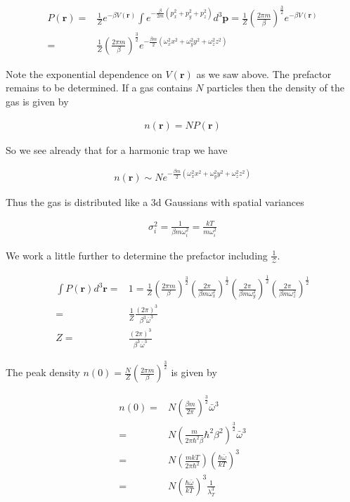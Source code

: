 \documentclass[12pt]{article}
\newcommand{\bv}[1]{\boldsymbol{#1}}
\newcommand{\mc}[1]{\mathcal{#1}}
\begin{document}
\begin{align}
P(\bv{r}) =& \frac{1}{Z} e^{-\beta V(\bv{r})} \int e^{-\frac{\beta}{2m}(p_x^2+p_y^2+p_z^2)} d^3\bv{p} = \frac{1}{Z} \left(\frac{2\pi m}{\beta}\right)^{\frac{3}{2}} e^{-\beta V(\bv{r})}\\
=& \frac{1}{Z} \left(\frac{2\pi m}{\beta}\right)^{\frac{3}{2}} e^{-\frac{\beta m}{2}\left(\omega_x^2 x^2 + \omega_y^2 y^2 + \omega_z^2 z^2\right)}
\end{align}

Note the exponential dependence on $V(\bv{r})$ as we saw above.
The prefactor remains to be determined.
If a gas contains $N$ particles then the density of the gas is given by

\begin{align}
n(\bv{r}) = NP(\bv{r})
\end{align}

So we see already that for a harmonic trap we have

\begin{align}
n(\bv{r}) \sim N e^{-\frac{\beta m}{2}\left(\omega_x^2 x^2 + \omega_y^2 y^2 + \omega_z^2 z^2\right)}
\end{align}

Thus the gas is distributed like a 3d Gaussians with spatial variances

\begin{align}
\sigma_i^2 = \frac{1}{\beta m \omega_i^2} = \frac{kT}{m\omega_i^2}
\end{align}

We work a little further to determine the prefactor including $\frac{1}{\mc{Z}}$.

\begin{align}
\int P(\bv{r})d^3\bv{r} =& 1 = \frac{1}{Z}\left(\frac{2\pi m}{\beta}\right)^{\frac{3}{2}} \left(\frac{2\pi}{\beta m \omega_x^2} \right)^{\frac{1}{2}}\left(\frac{2\pi}{\beta m \omega_y^2} \right)^{\frac{1}{2}}\left(\frac{2\pi}{\beta m \omega_z^2} \right)^{\frac{1}{2}}\\
=& \frac{1}{Z} \frac{(2\pi)^3}{\beta^3 \bar{\omega}^3}\\
Z =& \frac{(2 \pi)^3}{\beta^3 \bar{\omega}^3}
\end{align}

The peak density $n(0) = \frac{N}{Z}\left(\frac{2\pi m}{\beta}\right)^{\frac{3}{2}}$ is given by

\begin{align}
n(0) =& N\left(\frac{\beta m}{2\pi}\right)^{\frac{3}{2}} \bar{\omega}^3\\
=& N\left(\frac{m}{2\pi \hbar^2 \beta} \hbar^2 \beta^2 \right)^{\frac{3}{2}} \bar{\omega}^3\\
=& N\left(\frac{mkT}{2\pi \hbar^2}\right) \left(\frac{\hbar \bar{\omega}}{kT}\right)^3\\
=& N\left(\frac{\hbar \bar{\omega}}{kT}\right)^3 \frac{1}{\lambda_T^3}
\end{align}
\end{document}
